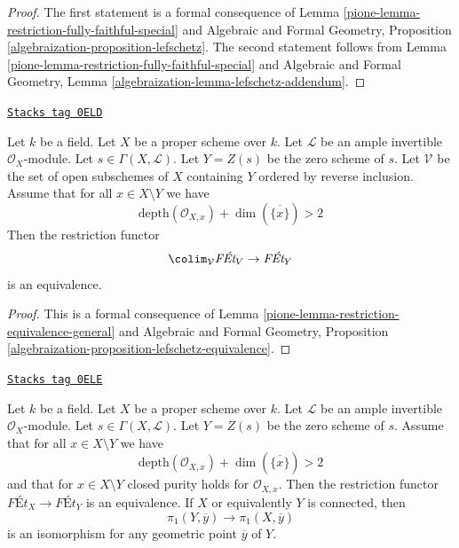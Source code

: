 \begin{proof}

The first statement is a formal consequence of
Lemma \ref{pione-lemma-restriction-fully-faithful-special}
and
Algebraic and Formal Geometry, Proposition
\ref{algebraization-proposition-lefschetz}.
The second statement follows from
Lemma \ref{pione-lemma-restriction-fully-faithful-special}
and
Algebraic and Formal Geometry, Lemma
\ref{algebraization-lemma-lefschetz-addendum}.
\end{proof}

\begin{proposition}
\label{pione-proposition-lefschetz-equivalence-general}
\href{https://stacks.math.columbia.edu/tag/0ELD}{\texttt{Stacks tag 0ELD}}

Let $k$ be a field. Let $X$ be a proper scheme over $k$.
Let $\mathcal{L}$ be an ample invertible $\mathcal{O}_X$-module.
Let $s \in \Gamma(X, \mathcal{L})$. Let $Y = Z(s)$ be the
zero scheme of $s$. Let $\mathcal{V}$ be the set of open
subschemes of $X$ containing $Y$ ordered by reverse inclusion.
Assume that for all $x \in X \setminus Y$ we have
$$
\text{depth}(\mathcal{O}_{X, x}) + \dim(\overline{\{x\}}) > 2
$$
Then the restriction functor
$$
\colim_\mathcal{V} \textit{F\'Et}_V \to \textit{F\'Et}_Y
$$
is an equivalence.
\end{proposition}

\begin{proof}

This is a formal consequence of
Lemma \ref{pione-lemma-restriction-equivalence-general} and
Algebraic and Formal Geometry, Proposition
\ref{algebraization-proposition-lefschetz-equivalence}.
\end{proof}

\begin{proposition}
\label{pione-proposition-lefschetz-equivalence}
\href{https://stacks.math.columbia.edu/tag/0ELE}{\texttt{Stacks tag 0ELE}}

Let $k$ be a field. Let $X$ be a proper scheme over $k$.
Let $\mathcal{L}$ be an ample invertible $\mathcal{O}_X$-module.
Let $s \in \Gamma(X, \mathcal{L})$. Let $Y = Z(s)$ be the
zero scheme of $s$.
Assume that for all $x \in X \setminus Y$ we have
$$
\text{depth}(\mathcal{O}_{X, x}) + \dim(\overline{\{x\}}) > 2
$$
and that for $x \in X \setminus Y$ closed purity holds for
$\mathcal{O}_{X, x}$. Then the restriction functor
$\textit{F\'Et}_X \to \textit{F\'Et}_Y$
is an equivalence. If $X$ or equivalently $Y$ is connected, then
$$
\pi_1(Y, \overline{y}) \to \pi_1(X, \overline{y})
$$
is an isomorphism for any geometric point $\overline{y}$ of $Y$.
\end{proposition}

